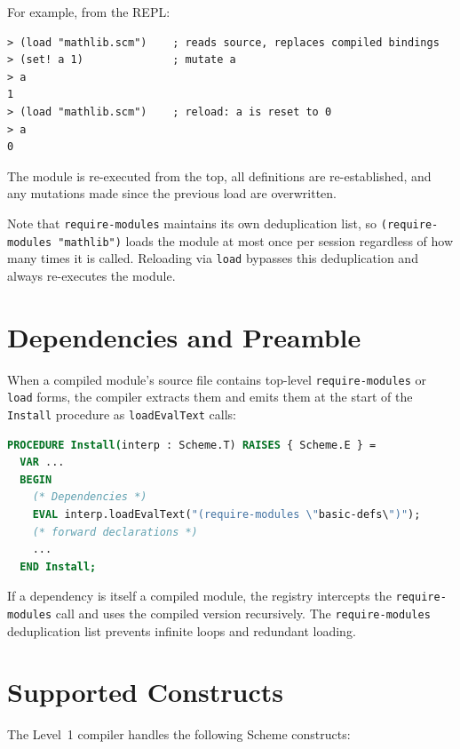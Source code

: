 \documentclass[12pt]{report}
\begin{document}
\noindent For example, from the REPL:

\begin{lstlisting}
> (load "mathlib.scm")    ; reads source, replaces compiled bindings
> (set! a 1)              ; mutate a
> a
1
> (load "mathlib.scm")    ; reload: a is reset to 0
> a
0
\end{lstlisting}

\noindent The module is re-executed from the top, all definitions are
re-established, and any mutations made since the previous load are
overwritten.

Note that \texttt{require-modules} maintains its own deduplication
list, so \texttt{(require-modules "mathlib")} loads the module at most
once per session regardless of how many times it is called.
Reloading via \texttt{load} bypasses this deduplication and always
re-executes the module.

\section{Dependencies and Preamble}

When a compiled module's source file contains top-level
\texttt{require-modules} or \texttt{load} forms, the compiler
extracts them and emits them at the start of the \texttt{Install}
procedure as \texttt{loadEvalText} calls:

\begin{lstlisting}[language=Modula3]
PROCEDURE Install(interp : Scheme.T) RAISES { Scheme.E } =
  VAR ...
  BEGIN
    (* Dependencies *)
    EVAL interp.loadEvalText("(require-modules \"basic-defs\")");
    (* forward declarations *)
    ...
  END Install;
\end{lstlisting}

If a dependency is itself a compiled module, the registry intercepts
the \texttt{require-modules} call and uses the compiled version
recursively.  The \texttt{require-modules} deduplication list
prevents infinite loops and redundant loading.

\section{Supported Constructs}

The Level~1 compiler handles the following Scheme constructs:
\end{document}
